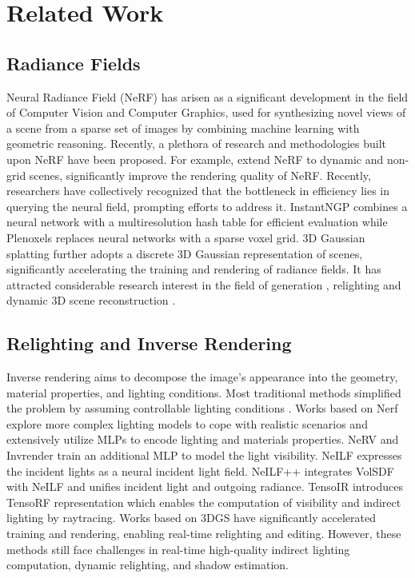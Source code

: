 \section{Related Work}
\label{sec:related_work}
\subsection{Radiance Fields}
Neural Radiance Field (NeRF) \cite{nerf} has arisen as a significant development in the field of Computer Vision and Computer Graphics, used for synthesizing novel views of a scene from a sparse set of images by combining machine learning with geometric reasoning. Recently, a plethora of research and methodologies built upon NeRF have been proposed. For example, \cite{park2021nerfies,pumarola2021dnerf,li2021SceneFlownerf,yan2023nerfds} extend NeRF to dynamic and non-grid scenes, \cite{barron2021mipnerf,barron2022mipnerf360} significantly improve the rendering quality of NeRF. Recently, researchers have collectively recognized that the bottleneck in efficiency lies in querying the neural field, prompting efforts to address it. InstantNGP \cite{muller2022instant} combines a neural network with a multiresolution
hash table for efficient evaluation while Plenoxels \cite{fridovich2022plenoxels} replaces neural networks with a sparse voxel grid. 3D Gaussian splatting \cite{3dgs} further adopts a discrete 3D Gaussian representation of scenes, significantly accelerating the training and rendering of radiance fields. It has attracted considerable
research interest in the field of generation \cite{yi2023gaussiandreamer,chen2023gaussianeditor}, relighting \cite{liang2023gsir,shi2023gir,gao2023relightable} and dynamic 3D scene reconstruction \cite{wu20234d,yang2023real}. 



\subsection{Relighting and Inverse Rendering}
Inverse rendering \cite{sato1997object,sato2003illumination} aims to decompose the image’s appearance into the geometry, material properties, and lighting conditions. Most traditional methods simplified the problem by assuming controllable lighting conditions \cite{yu2019inverserendernet,azinovic2019inversepathtracing}. Works based on Nerf explore more complex lighting models to cope with realistic scenarios and extensively utilize MLPs to encode lighting and materials properties. NeRV \cite{srinivasan2021nerv} and Invrender \cite{invrender} train an additional MLP to model the light visibility. NeILF \cite{yao2022neilf} expresses the incident lights as a neural incident light field. NeILF++ \cite{zhang2023neilf++}  integrates VolSDF with NeILF and unifies incident light and outgoing radiance. TensoIR \cite{jin2023tensoir} introduces 
TensoRF representation which enables the computation of visibility and indirect lighting by raytracing. Works based on 3DGS \cite{gao2023relightable,shi2023gir,liang2023gsir} have significantly accelerated training and rendering, enabling real-time relighting and editing. However, these methods still face challenges in real-time high-quality indirect lighting computation, dynamic relighting, and shadow estimation. 
